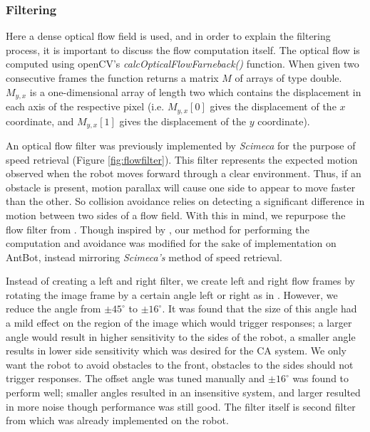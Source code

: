 \documentclass[a4paper,11pt,twoside,openright]{article}
\begin{document}
\subsubsection{Filtering}
Here a dense optical flow field is used, and in order to explain the filtering process, it is important
to discuss the flow computation itself. The optical flow is computed using openCV's
\textit{calcOpticalFlowFarneback()} function. When given two consecutive frames the function returns
a matrix $M$ of arrays of type double. $M_{y,x}$ is a one-dimensional array of length two which contains
the displacement in each axis of the respective pixel (i.e. $M_{y,x}[0]$ gives the displacement of the $x$
coordinate, and $M_{y,x}[1]$ gives the displacement of the $y$ coordinate).
\newline

An optical flow filter was previously implemented by \textit{Scimeca} for the purpose of speed retrieval (Figure \ref{fig:flowfilter}).
This filter represents the expected motion observed when the robot moves forward through a clear environment. Thus, if an
obstacle is present, motion parallax will cause one side to appear to move faster than the other. So
collision avoidance relies on detecting a significant difference in motion between two sides of a flow field.
With this in mind, we repurpose the flow filter from \cite{Scimeca2017}. Though inspired by \cite{Stewart2010},
our method for performing the computation and avoidance was modified for the sake of
implementation on AntBot, instead mirroring \textit{Scimeca's} method of speed retrieval.
\newline

Instead of creating
a left and right filter, we create left and right flow frames by rotating the image frame
by a certain angle left or right as in \cite{Scimeca2017}. However, we reduce the angle from $\pm 45^{\circ}$
\cite{Scimeca2017} to $\pm 16^{\circ}$. It was found that the size of this angle had a mild effect on the region of the 
image which would trigger responses; a larger angle would result in higher sensitivity to the sides of the
robot, a smaller angle results in lower side sensitivity which was desired for the CA system. We only
want the robot to avoid obstacles to the front, obstacles to the sides should not trigger responses. The offset
angle was tuned manually and $\pm 16^{\circ}$ was found to perform well; smaller angles resulted in
an insensitive system, and larger resulted in more noise though performance was still good. The filter
itself is second filter from \cite{Scimeca2017} which was already implemented on the robot.
\newline
\end{document}
